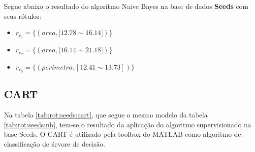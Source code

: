 %  





Segue abaixo o resultado do algoritmo Naive Bayes na base de dados \textbf{Seeds} com seus rótulos: 
\begin{itemize}[noitemsep]
 \item ${r_{c_1}=\{ (area, ]12.78 \sim 16.14]) \} }$  
 \item ${r_{c_2}=\{ (area, ]16.14 \sim 21.18]) \} }$
 \item ${r_{c_3}=\{ (perimetro, [12.41 \sim 13.73])\} }$
\end{itemize}


\subsection{CART}\label{cap:resultados:ssec:seed:cart}

Na tabela \ref{tab:rot:seeds:cart}, que segue o mesmo modelo da tabela \ref{tab:rot:seeds:nb}, tem-se o resultado da aplicação do algoritmo supervisionado na base Seeds. O CART é utilizado pela toolbox do MATLAB como algoritmo de classificação de árvore de decisão. 

